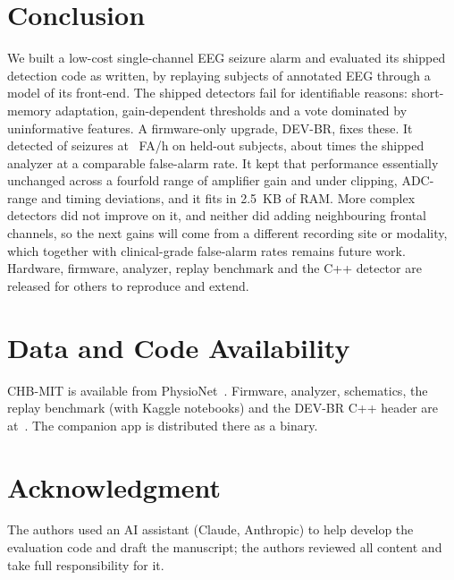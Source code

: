 \documentclass[conference,letterpaper]{IEEEtran}
\begin{document}
\section{Conclusion}
We built a low-cost single-channel EEG seizure alarm and evaluated its shipped detection code as written, by replaying \NSubj{} subjects of annotated EEG through a model of its front-end. The shipped detectors fail for identifiable reasons: short-memory adaptation, gain-dependent thresholds and a vote dominated by uninformative features. A firmware-only upgrade, DEV-BR, fixes these. It detected \DevASens{} of seizures at \DevAFAh{}~FA/h on held-out subjects, about \FoldDevPy{} times the shipped analyzer at a comparable false-alarm rate. It kept that performance essentially unchanged across a fourfold range of amplifier gain and under clipping, ADC-range and timing deviations, and it fits in 2.5~KB of RAM. More complex detectors did not improve on it, and neither did adding neighbouring frontal channels, so the next gains will come from a different recording site or modality, which together with clinical-grade false-alarm rates remains future work. Hardware, firmware, analyzer, replay benchmark and the C++ detector are released for others to reproduce and extend.

\section*{Data and Code Availability}
CHB-MIT is available from PhysioNet~\cite{goldberger2000physionet}. Firmware, analyzer, schematics, the replay benchmark (with Kaggle notebooks) and the DEV-BR C++ header are at~\cite{vera_repo}. The companion app is distributed there as a binary.

\section*{Acknowledgment}
The authors used an AI assistant (Claude, Anthropic) to help develop the evaluation code and draft the manuscript; the authors reviewed all content and take full responsibility for it.



\end{document}
